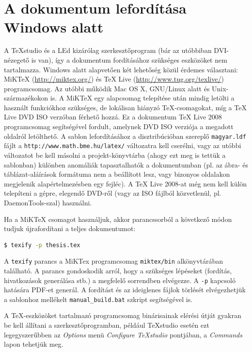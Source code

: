 \section{A dokumentum lefordítása Windows alatt}
A TeXstudio és a LEd kizárólag szerkesztőprogram (bár az utóbbiban DVI-nézegető is van), így a dokumentum fordításához szükséges eszközöket nem tartalmazza. Windows alatt alapvetően két lehetőség közül érdemes választani: MiKTeX (\url{http://miktex.org/}) és TeX Live (\url{http://www.tug.org/texlive/}) programcsomag. Az utóbbi működik Mac OS X, GNU/Linux alatt és Unix-származékokon is. A MiKTeX egy alapcsomag telepítése után mindig letölti a használt funkciókhoz szükséges, de lokálisan hiányzó \TeX-csomagokat, míg a TeX Live DVD ISO verzóban férhető hozzá. Ez a dokumentum TeX Live 2008 programcsomag segítségével fordult, amelynek DVD ISO verziója a megadott oldalról letölthető. A sablon lefordításához a disztribúcióban szereplő \verb+magyar.ldf+ fájlt a \verb+http://www.math.bme.hu/latex/+ változatra kell cserélni, vagy az utóbbi változatot be kell másolni a projekt-könyvtárba (ahogy ezt meg is tettük a sablonban) különben anomáliák tapasztalhatók a dokumentumban (pl. az ábra- és táblázat-aláírások formátuma nem a beállított lesz, vagy bizonyos oldalakon megjelenik alapértelmezésben egy fejléc). A TeX Live 2008-at még nem kell külön telepíteni a gépre, elegendő DVD-ről (vagy az ISO fájlból közvetlenül, pl. DaemonTools-szal) használni.

Ha a MiKTeX csomagot használjuk, akkor parancssorból a következő módon tudjuk újrafordítani a teljes dokumentumot:

\begin{lstlisting}[language=bash,frame=single,float=!ht]
$ texify -p thesis.tex
\end{lstlisting}

A \verb+texify+ parancs a MiKTex programcsomag \verb+miktex/bin+ alkönyvtárában található. A parancs gondoskodik arról, hogy a szükséges lépéseket (fordítás, hivatkozások generálása stb.) a megfelelő sorrendben elvégezze. A \verb+-p+ kapcsoló hatására PDF-et generál. A fordítást és az ideiglenes fájlok törlését elvégezhetjük a sablonhoz mellékelt \verb+manual_build.bat+ szkript segítségével is.

A \TeX-eszközöket tartalmazó programcsomag binárisainak elérési útját gyakran be kell állítani a szerkesztőprogramban, például TeXstudio esetén ezt legegyszerűbben az \emph{Options} menü \emph{Configure TeXstudio} pontjában, a \emph{Commands} lapon tehetjük meg.

